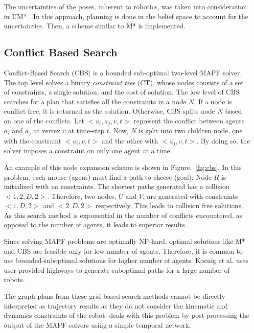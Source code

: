 The uncertainties of the poses, inherent to robotics, was taken into consideration in UM* \cite{Wagner2017PathPF}. In this approach, planning is done in the belief space to account for the uncertainties. Then, a scheme similar to M* is implemented. 
\subsection{Conflict Based Search}
Conflict-Based Search (CBS) is a bounded sub-optimal two-level MAPF solver. The top level solves a binary \textit{constraint tree} (CT), whose nodes consists of a set of constraints, a single solution, and the cost of solution. The low level of CBS searches for a plan that satisfies all the constraints in a node $N$. If a node is conflict-free, it is returned as the solution. Otherwise, CBS splits node $N$ based on one of the conflicts. Let $<a_i, a_j, v, t>$ represent the conflict between agents $a_i$ and $a_j$ at vertex $v$ at time-step $t$. Now, $N$ is split into two children node, one with the constraint $<a_i, v, t>$ and the other with $<a_j,v,t>$. By doing so, the solver imposes a constraint on only one agent at a time. 

An example of this node expansion scheme is shown in Figure.~\ref{fig:cbs}. In this problem, each mouse (agent) must find a path to cheese (goal). Node $R$ is initialized with no constraints. The shortest paths generated has a collision $<1,2,D,2>$. Therefore, two nodes, $U$ and $V$, are generated with constraints $<1,D,2>$ and $<2,D,2>$ respectively. This leads to collision free solutions. As this search method is exponential in the number of conflicts encountered, as opposed to the number of agents, it leads to superior results. 

Since solving MAPF problems are optimally NP-hard, optimal solutions like M* and CBS are feasible only for low number of agents. Therefore, it is common to use bounded-suboptimal solutions for higher number of agents. Koenig et al. \cite{cohen2016bounded} uses user-provided highways to generate suboptimal paths for a large number of robots. 

The graph plans from these grid based search methods cannot be directly interpreted as trajectory results as they do not consider the kinematic and dynamics constraints of the robot. \cite{honig2016multi} deals with this problem by post-processing the output of the MAPF solvers using a simple temporal network. 

